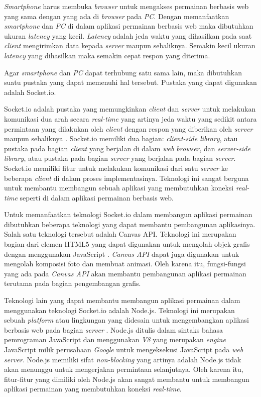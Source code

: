 \textit{Smartphone} harus membuka \textit{browser} untuk mengakses permainan berbasis web yang sama dengan yang ada di \textit{browser} pada \textit{PC}. Dengan memanfaatkan \textit{smartphone} dan \textit{PC} di dalam aplikasi permainan berbasis web maka dibutuhkan ukuran \textit{latency} yang kecil. \textit{Latency} adalah jeda waktu yang dihasilkan pada saat \textit{client} mengirimkan data kepada \textit{server} maupun sebaliknya. Semakin kecil ukuran \textit{latency} yang dihasilkan maka semakin cepat respon yang diterima.

Agar \textit{smartphone} dan \textit{PC} dapat terhubung satu sama lain, maka dibutuhkan suatu pustaka yang dapat memenuhi hal tersebut. Pustaka yang dapat digunakan adalah Socket.io.

Socket.io adalah pustaka yang memungkinkan \textit{client} dan \textit{server} untuk melakukan komunikasi dua arah secara \textit{real-time} yang artinya jeda waktu yang sedikit antara permintaan yang dilakukan oleh \textit{client} dengan respon yang diberikan oleh \textit{server} maupun sebaliknya  \cite{damien:11:socketiodocs}. Socket.io memiliki dua bagian: \textit{client-side library}, atau pustaka pada bagian \textit{client} yang berjalan di dalam \textit{web browser}, dan \textit{server-side library}, atau pustaka pada bagian \textit{server} yang berjalan pada bagian \textit{server}. Socket.io memiliki fitur untuk melakukan komunikasi dari satu \textit{server} ke beberapa \textit{client} di dalam proses implementasinya. Teknologi ini sangat berguna untuk membantu membangun sebuah aplikasi yang membutuhkan koneksi \textit{real-time} seperti di dalam aplikasi permainan berbasis web.

Untuk memanfaatkan teknologi Socket.io dalam membangun aplikasi permainan dibutuhkan beberapa teknologi yang dapat membantu pembangunan aplikasinya. Salah satu teknologi tersebut adalah Canvas API. Teknologi ini merupakan bagian dari elemen HTML5 yang dapat digunakan untuk mengolah objek grafis dengan menggunakan JavaScript \cite{moz:04:canvasapi}. \textit{Canvas API} dapat juga digunakan untuk mengolah komposisi foto dan membuat animasi. Oleh karena itu, fungsi-fungsi yang ada pada \textit{Canvas API} akan membantu pembangunan aplikasi permainan terutama pada bagian pengembangan grafis.

Teknologi lain yang dapat membantu membangun aplikasi permainan dalam menggunakan teknologi Socket.io adalah Node.js. Teknologi ini merupakan sebuah \textit{platform} atau lingkungan yang didesain untuk mengembangkan aplikasi berbasis web pada bagian \textit{server} \cite{nodeFound:09:nodejsdocs}. Node.js ditulis dalam sintaks bahasa pemrograman JavaScript dan menggunakan \textit{V8} yang merupakan \textit{engine} JavaScript milik perusahaan \textit{Google} untuk mengeksekusi JavaScript pada \textit{web server}. Node.js memiliki sifat \textit{non-blocking} yang artinya adalah Node.js tidak akan menunggu untuk mengerjakan permintaan selanjutnya. Oleh karena itu, fitur-fitur yang dimiliki oleh Node.js akan sangat membantu untuk membangun aplikasi permainan yang membutuhkan koneksi \textit{real-time}.

